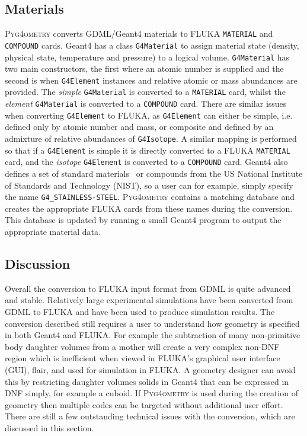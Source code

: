 \documentclass[final,5p,times,twocolumn]{elsarticle}
\newcommand{\pyinline}[1]{\lstinline[postbreak={}]{#1}}
\newcommand{\cpinline}[1]{\lstinline[postbreak={}]{#1}}
\newcommand{\fluka}[1]{\texttt{\MakeUppercase{#1}}}
\newcommand{\PYGEOMETRY}{\textsc{Pyg4ometry}}
\begin{document}
\subsection{Materials}
\PYGEOMETRY{} converts GDML/Geant4 materials to FLUKA \verb|MATERIAL| and \verb|COMPOUND| cards.
Geant4 has a class \cpinline{G4Material} to assign material state (density, physical state, temperature and pressure) 
to a logical volume. \cpinline{G4Material} has two main constructors, the first where an atomic number is supplied and 
the second is when \cpinline{G4Element} instances and relative atomic or mass abundances are provided. The {\em simple}
\cpinline{G4Material} is converted to a \fluka{material} card, whilst the {\em element} \cpinline{G4Material}  is converted to a 
\fluka{compound} card. There are similar issues when converting \cpinline{G4Element} to FLUKA, as \cpinline{G4Element}
can either be simple, i.e. defined only by atomic number and mass, or composite and defined by an admixture of 
relative abundances of \cpinline{G4Isotope}. A similar mapping is performed so that if a \cpinline{G4Element} is simple it is 
directly converted to a FLUKA \fluka{MATERIAL} card, and the {\it isotope} \cpinline{G4Element} is converted to a \fluka{compound}
card. Geant4 also defines a set of standard materials~\cite{Geant4MaterialDB} or compounds from the US National Institute 
of Standards and Technology (NIST), so a user can for example, simply
specify the name \pyinline{G4_STAINLESS-STEEL}. \PYGEOMETRY{}  contains a matching database and creates the appropriate FLUKA 
cards from these names during the conversion. This database is updated by running a small Geant4 program to output the appropriate
material data.

\subsection{Discussion}
Overall the conversion to FLUKA input format from GDML is quite 
advanced and stable. Relatively large experimental simulations 
have been converted from GDML to FLUKA and have been used to produce 
simulation results. The conversion described still requires a user to
understand how geometry is specified in both Geant4 and FLUKA. For 
example the subtraction of many non-primitive body daughter volumes from 
a mother will create a very complex non-DNF region which is inefficient when viewed in 
FLUKA's graphical user interface (GUI), flair, and used for simulation in FLUKA.
A geometry designer can avoid this by
restricting daughter volumes solids in Geant4 that can be expressed in DNF simply,
for example a cuboid.  If \PYGEOMETRY{} is used during the creation of
 geometry then multiple codes can be targeted without additional user effort. 
There are still a few outstanding technical issues with the conversion, which are discussed 
in this section.
\end{document}
